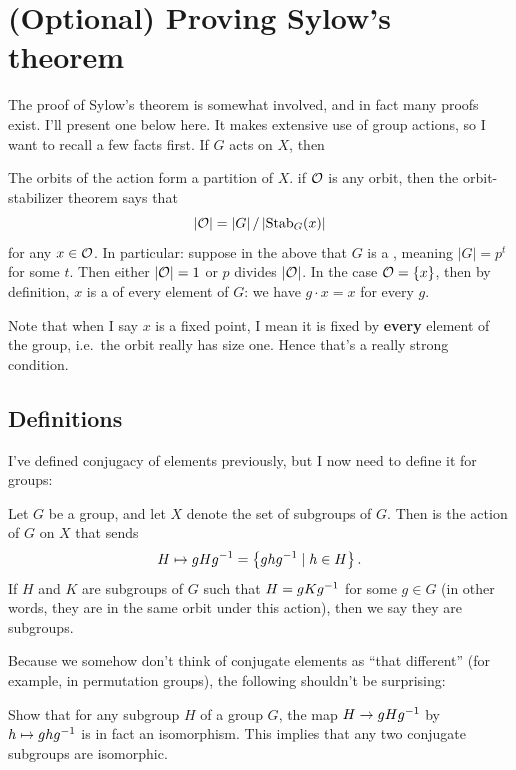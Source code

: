 \section{(Optional) Proving Sylow's theorem}
The proof of Sylow's theorem is somewhat involved,
and in fact many proofs exist.  I'll present one below here.
It makes extensive use of group actions,
so I want to recall a few facts first.
If $G$ acts on $X$, then
\begin{itemize}
	\ii The orbits of the action form a partition of $X$.
	\ii if $\mathcal O$ is any orbit, then the orbit-stabilizer theorem says that
	\[ \left\lvert \mathcal O \right\rvert = \left\lvert G \right\rvert / \left\lvert \operatorname{Stab}_G(x) \right\rvert \]
	for any $x \in \mathcal O$.
	\ii In particular: suppose in the above that $G$ is a ,
	meaning $|G| = p^t$ for some $t$.
	Then either $\left\lvert \mathcal O \right\rvert = 1$ or $p$ divides $\left\lvert \mathcal O \right\rvert$.
	In the case $\mathcal O = \{x\}$, then by definition, $x$ is a  of every element of $G$: we have $g \cdot x = x$ for every $g$.
\end{itemize}
Note that when I say $x$ is a fixed point, I mean it is fixed by \textbf{every} element of the group, i.e.\ the orbit really has size one. Hence that's a really strong condition.

\subsection{Definitions}
I've defined conjugacy of elements previously,
but I now need to define it for groups:
\begin{definition}
	Let $G$ be a group, and let $X$ denote the set of subgroups of $G$.
	Then  is the action of $G$ on $X$ that sends
	\[ H \mapsto gHg^{-1} = \left\{ ghg^{-1} \mid h \in H \right\}. \]
	If $H$ and $K$ are subgroups of $G$ such that $H = gKg^{-1}$ for some $g \in G$
	(in other words, they are in the same orbit under this action),
	then we say they are  subgroups.
\end{definition}

Because we somehow don't think of conjugate elements as
``that different'' (for example, in permutation groups),
the following shouldn't be surprising:
\begin{ques}
	Show that for any subgroup $H$ of a group $G$, the map $H \to gHg^{-1}$ by
	$h \mapsto ghg^{-1}$ is in fact an isomorphism.
	This implies that any two conjugate subgroups are isomorphic.
\end{ques}

